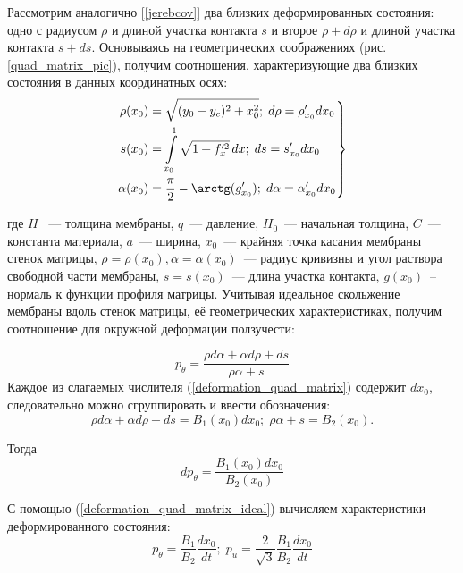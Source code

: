 	
Рассмотрим аналогично [\ref{jerebcov}] два близких деформированных состояния:
одно  с радиусом $\rho$ и длиной участка контакта $s$ и второе $\rho+d\rho$ и длиной участка контакта $s+ds$. Основываясь на геометрических соображениях (рис. \ref{quad_matrix_pic}), получим соотношения, характеризующие два близких состояния в данных координатных осях:
\begin{eqnarray}
\left. 
\begin{split}
\rho(x_0) &= \sqrt{(y_0-y_c)^2 + x_0^2};\; d\rho = \rho'_{x_0}dx_0\\
s(x_0) &= \int\limits^1_{x_0}\sqrt{1+f_x'^2}\,dx; \; ds = s'_{x_0}dx_0\\
\alpha(x_0)&= \dfrac{\pi}{2} - \arctg(g'_{x_0});\; d\alpha = \alpha'_{x_0}dx_0
\end{split}
\right\}
\end{eqnarray}

где $H$ ~--- толщина мембраны, $q$~--- давление, $H_0$~--- начальная толщина, $C$~---  константа материала, $a$~--- ширина, $x_0$~--- крайняя точка касания мембраны стенок матрицы, $\rho=\rho(x_0), \alpha=\alpha(x_0)$~--- радиус кривизны и угол раствора свободной части мембраны, $s=s(x_0)$~--- длина участка контакта,
$g(x_0)$~-- нормаль к функции профиля матрицы. 
Учитывая идеальное скольжение мембраны вдоль стенок матрицы, её геометрических характеристиках, получим соотношение для окружной деформации ползучести:

\begin{equation}
p_\theta = \dfrac{\rho d\alpha +\alpha d\rho+ds}{\rho\alpha+s}
\label{deformation_quad_matrix}
\end{equation}
Каждое из слагаемых числителя (\ref{deformation_quad_matrix}) содержит $dx_0$, следовательно можно сгруппировать и ввести обозначения: 
\begin{equation}
\rho d\alpha + \alpha d\rho +ds = B_1(x_0)dx_0;\; \rho\alpha+s = B_2(x_0).
\end{equation}

Тогда 
\begin{equation}
	dp_\theta = \dfrac{B_1(x_0)dx_0}{B_2(x_0)}
	\label{deformation_quad_matrix_ideal}
\end{equation}
 
 С помощью (\ref{deformation_quad_matrix_ideal}) вычисляем характеристики деформированного состояния:
 \begin{equation}
 \dot{p_\theta} = \dfrac{B_1}{B_2}\dfrac{dx_0}{dt};\;
 \dot{p_u}  = \dfrac{2}{\sqrt3} \dfrac{B_1}{B_2}\dfrac{dx_0}{dt}
 \end{equation}
 
